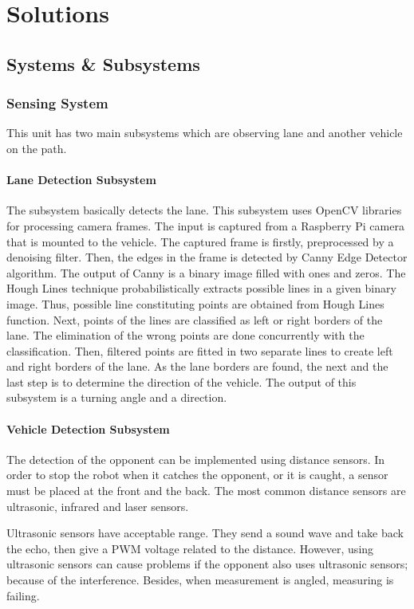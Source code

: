 \documentclass[a4paper,12pt]{article}
\begin{document}
\section{Solutions}

	\subsection{Systems \& Subsystems}

	\subsubsection{Sensing System}
		This unit has two main subsystems which are observing lane and another vehicle on the path. 
		
		\paragraph{Lane Detection Subsystem}
			The subsystem basically detects the lane. This subsystem uses OpenCV libraries for processing camera frames. The input is captured from a Raspberry Pi camera that is mounted to the vehicle. The captured frame is firstly, preprocessed by a denoising filter. Then, the edges in the frame is detected by Canny Edge Detector algorithm. The output of Canny is a binary image filled with ones and zeros. The Hough Lines technique probabilistically extracts possible lines in a given binary image. Thus, possible line constituting points are obtained from Hough Lines function. Next, points of the lines are classified as left or right borders of the lane. The elimination of the wrong points are done concurrently with the classification. Then, filtered points are fitted in two separate lines to create left and right borders of the lane. As the lane borders are found, the next and the last step is to determine the direction of the vehicle. The output of this subsystem is a turning angle and a direction.

		\paragraph{Vehicle Detection Subsystem}
			The detection of the opponent can be implemented using distance sensors. In order to stop the robot when it catches the opponent, or it is caught, a sensor must be placed at the front and the back. The most common distance sensors are ultrasonic, infrared and laser sensors. 

Ultrasonic sensors have acceptable range. They send a sound wave and take back the echo, then give a PWM voltage related to the distance. However, using ultrasonic sensors can cause problems if the opponent also uses ultrasonic sensors; because of the interference. Besides, when measurement is angled, measuring is failing. 
\end{document}
